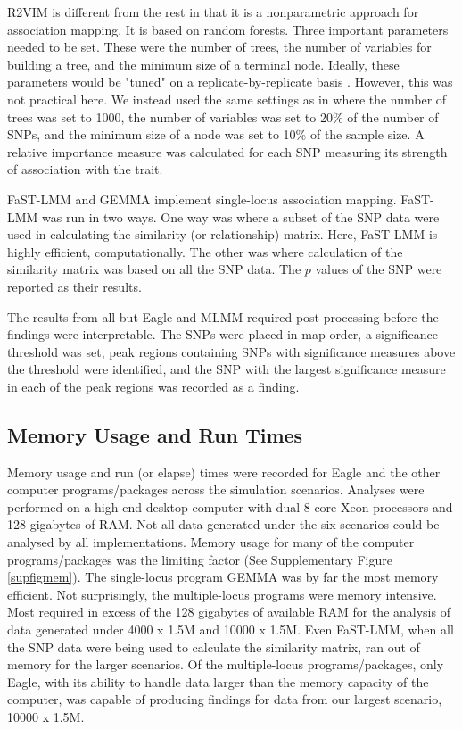 \documentclass{nature}
\begin{document}
R2VIM is different from the rest in that it is a nonparametric approach for association mapping. It is based on random forests. Three important parameters needed to be  set. 
These were the number of trees, the number of variables for building a tree, and the minimum size of a terminal node. Ideally, these parameters would be "tuned" on a replicate-by-replicate 
basis \cite{boulesteix2012overview}. However, this was not practical here. We instead used the same settings as in \cite{szymczak2016r2vim} where 
the number of trees was set to 1000, the number of variables was set to 20\% of the number of SNPs, and 
  the minimum size of a node was set to 10\% of the sample size.
A relative importance measure was calculated 
for each SNP measuring its strength of association with the trait.

FaST-LMM and GEMMA implement single-locus association mapping. FaST-LMM was run in two ways. One way was where a subset of the SNP data were used in calculating the similarity (or relationship) matrix. Here, FaST-LMM is highly efficient, computationally. The other was where calculation of the similarity matrix was based on all the SNP data. The $p$ values of the SNP were reported as their results. 


The results from all but Eagle and MLMM required post-processing before the findings were interpretable.  The SNPs were placed in map order, 
a significance threshold was set, peak regions containing SNPs with significance measures above the threshold were identified, and the SNP with the largest 
significance measure in each of the peak regions was recorded as a finding. 


 



\subsection{Memory Usage and Run Times}

Memory usage and run (or elapse) times were recorded for Eagle and the other computer programs/packages across the simulation scenarios. 
Analyses were performed on a high-end desktop computer with dual 8-core Xeon processors and 128 gigabytes of RAM. Not all data generated under the six scenarios could be analysed by all implementations. Memory usage 
for many of the computer programs/packages was the limiting factor (See Supplementary Figure \ref{supfigmem}).  The single-locus program GEMMA was by 
far the most memory efficient. Not surprisingly, the multiple-locus programs were memory intensive. Most required in 
excess of the 128 gigabytes of available RAM for the analysis of data generated under 4000 x 1.5M and 10000 x 1.5M.  
Even FaST-LMM, when all the SNP data were being used to calculate the similarity matrix, ran out of memory for the larger scenarios.
Of the multiple-locus programs/packages, only Eagle,  
with its ability to handle data larger than the memory capacity of the computer, was capable of producing findings 
for data from our largest scenario, 10000 x 1.5M. 
\end{document}
